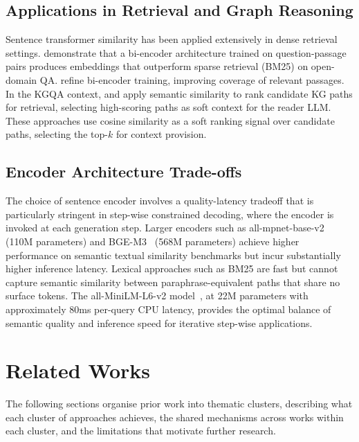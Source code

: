 \subsection{Applications in Retrieval and Graph Reasoning}

Sentence transformer similarity has been applied extensively in dense retrieval settings. \citet{karpukhin2020dpr} demonstrate that a bi-encoder architecture trained on question-passage pairs produces embeddings that outperform sparse retrieval (BM25) on open-domain QA. \citet{xiong2020adore} refine bi-encoder training, improving coverage of relevant passages. In the KGQA context, \citet{shi2021kgpath} and \citet{saxena2022kgqa} apply semantic similarity to rank candidate KG paths for retrieval, selecting high-scoring paths as soft context for the reader LLM. These approaches use cosine similarity as a soft ranking signal over candidate paths, selecting the top-$k$ for context provision.

\subsection{Encoder Architecture Trade-offs}

The choice of sentence encoder involves a quality-latency tradeoff that is particularly stringent in step-wise constrained decoding, where the encoder is invoked at each generation step. Larger encoders such as all-mpnet-base-v2 (110M parameters) and BGE-M3~\citep{chen2024bge} (568M parameters) achieve higher performance on semantic textual similarity benchmarks but incur substantially higher inference latency. Lexical approaches such as BM25 are fast but cannot capture semantic similarity between paraphrase-equivalent paths that share no surface tokens. The all-MiniLM-L6-v2 model~\citep{reimers2019sbert}, at 22M parameters with approximately 80ms per-query CPU latency, provides the optimal balance of semantic quality and inference speed for iterative step-wise applications.

\section{Related Works}
\label{sec:related}

The following sections organise prior work into thematic clusters, describing what each cluster of approaches achieves, the shared mechanisms across works within each cluster, and the limitations that motivate further research.

